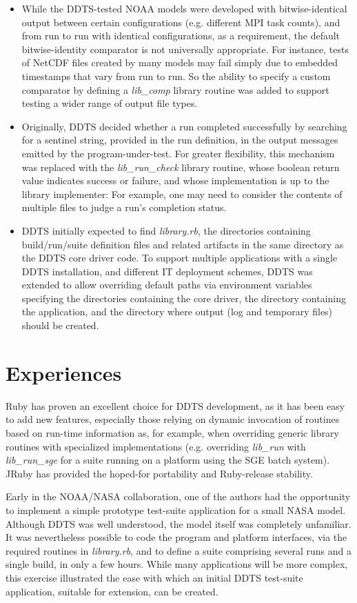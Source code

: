 \documentclass[conference]{IEEEtran}
\begin{document}
\begin{itemize}
\item While the DDTS-tested NOAA models were developed with bitwise-identical output between certain configurations (e.g. different MPI task counts), and from run to run with identical configurations, as a requirement, the default bitwise-identity comparator is not universally appropriate. For instance, tests of NetCDF files created by many models may fail simply due to embedded timestamps that vary from run to run. So the ability to specify a custom comparator by defining a \emph{lib\_comp} library routine was added to support testing a wider range of output file types.
\item Originally, DDTS decided whether a run completed successfully by searching for a sentinel string, provided in the run definition, in the output messages emitted by the program-under-test. For greater flexibility, this mechanism was replaced with the \emph{lib\_run\_check} library routine, whose boolean return value indicates success or failure, and whose implementation is up to the library implementer: For example, one may need to consider the contents of multiple files to judge a run's completion status.
\item DDTS initially expected to find \emph{library.rb}, the directories containing build/run/suite definition files and related artifacts in the same directory as the DDTS core driver code. To support multiple applications with a single DDTS installation, and different IT deployment schemes, DDTS was extended to allow overriding default paths via environment variables specifying the directories containing the core driver, the directory containing the application, and the directory where output (log and temporary files) should be created.
\end{itemize}

\section{Experiences}

Ruby has proven an excellent choice for DDTS development, as it has been easy to add new features, especially those relying on dynamic invocation of routines based on run-time information as, for example, when overriding generic library routines with specialized implementations (e.g. overriding \emph{lib\_run} with \emph{lib\_run\_sge} for a suite running on a platform using the SGE batch system). JRuby has provided the hoped-for portability and Ruby-release stability.

Early in the NOAA/NASA collaboration, one of the authors had the opportunity to implement a simple prototype test-suite application for a small NASA model. Although DDTS was well understood, the model itself was completely unfamiliar. It was nevertheless possible to code the program and platform interfaces, via the required routines in \emph{library.rb}, and to define a suite comprising several runs and a single build, in only a few hours. While many applications will be more complex, this exercise illustrated the ease with which an initial DDTS test-suite application, suitable for extension, can be created.
\end{document}
